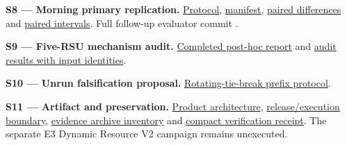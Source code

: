 \documentclass[12pt,a4paper]{article}
\begin{document}
\label{source-s8}

\textbf{S8 --- Morning primary replication.} \href{\detokenize{../../evaluation/vec_followup_2026-09-07/generalisation-replication-2026-09-07/PROTOCOL.md}}{Protocol}, \href{\detokenize{../../evaluation/vec_followup_2026-09-07/generalisation-replication-2026-09-07/manifest.json}}{manifest}, \href{\detokenize{../../evaluation/vec_followup_2026-09-07/generalisation-replication-2026-09-07/paired_differences.csv}}{paired differences} and \href{\detokenize{../../evaluation/vec_followup_2026-09-07/generalisation-replication-2026-09-07/paired_intervals.csv}}{paired intervals}. Full follow-up evaluator commit .

\label{source-s9}

\textbf{S9 --- Five-RSU mechanism audit.} \href{\detokenize{../../evaluation/common_target_mechanism_audit_2026-09-07/evidence/REPORT.md}}{Completed post-hoc report} and \href{\detokenize{../../evaluation/common_target_mechanism_audit_2026-09-07/evidence/audit_results.json}}{audit results with input identities}.

\label{source-s10}

\textbf{S10 --- Unrun falsification proposal.} \href{\detokenize{../../evaluation/common_target_mechanism_audit_2026-09-07/TIEBREAK_PREFIX_PROPOSAL.md}}{Rotating-tie-break prefix protocol}.

\label{source-s11}

\textbf{S11 --- Artifact and preservation.} \href{\detokenize{../../architecture_current_release.md}}{Product architecture}, \href{\detokenize{../../quality/final_release_status_20260815.md}}{release/execution boundary}, \href{\detokenize{../../evaluation/vec_followup_2026-09-07/ARCHIVE_INVENTORY.json}}{evidence archive inventory} and \href{\detokenize{../../evaluation/vec_followup_2026-09-07/COMPACT_VERIFICATION.json}}{compact verification receipt}. The separate E3 Dynamic Resource V2 campaign remains unexecuted.

\label{source-s12}
\end{document}
